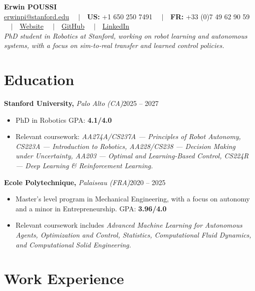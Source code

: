 \documentclass[10pt,letterpaper]{article}
\newcommand{\entry}[3]{%
  \vspace{1pt}\noindent\textbf{#1} \textit{#2}\hfill #3\par}
\begin{document}
\begin{center}
  {\LARGE \textbf{Erwin POUSSI}}\\[4pt]
  \href{mailto:erwinpi@stanford.edu}{erwinpi@stanford.edu} \ \ $\vert$\ \ \textbf{US:} +1 650 250 7491 \ \ $\vert$\ \ \textbf{FR:} +33 (0)7 49 62 90 59 \ \ $\vert$\ \ \href{https://rwin2.github.io/erwinpoussi.github.io/}{Website} \ \ $\vert$\ \ \href{https://github.com/Rwin2}{GitHub} \ \ $\vert$\ \ \href{https://www.linkedin.com/in/erwin-poussi-a05099215/}{LinkedIn}\\[4pt]
  \textit{PhD student in Robotics at Stanford, working on robot learning and autonomous systems, with a focus on sim-to-real transfer and learned control policies.}
\end{center}

\section{Education}

\entry{Stanford University,}{Palo Alto (CA)}{2025 -- 2027}
\begin{itemize}
  \item PhD in Robotics \hfill GPA: \textbf{4.1/4.0}
  \item Relevant coursework: \textit{AA274A/CS237A --- Principles of Robot Autonomy, CS223A --- Introduction to Robotics, AA228/CS238 --- Decision Making under Uncertainty, AA203 --- Optimal and Learning-Based Control, CS224R --- Deep Learning \& Reinforcement Learning.}
\end{itemize}

\entry{Ecole Polytechnique,}{Palaiseau (FRA)}{2020 -- 2025}
\begin{itemize}
  \item Master's level program in Mechanical Engineering, with a focus on autonomy and a minor in Entrepreneurship. GPA: \textbf{3.96/4.0}
  \item Relevant coursework includes \textit{Advanced Machine Learning for Autonomous Agents, Optimization and Control, Statistics, Computational Fluid Dynamics, and Computational Solid Engineering.}
\end{itemize}

\section{Work Experience}
\end{document}
